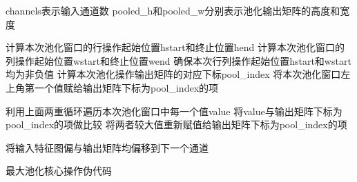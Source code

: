 \begin{algorithm}[htbp]
	\small
	\SetAlgoLined
    \begin{spacing}{0.8}
    channels表示输入通道数\;
    pooled\_h和pooled\_w分别表示池化输出矩阵的高度和宽度\;
     {
         {
             {
                计算本次池化窗口的行操作起始位置hstart和终止位置hend\;
                计算本次池化窗口的列操作起始位置wstart和终止位置wend\;
                确保本次行列操作起始位置hstart和wstart均为非负值\;
                计算本次池化操作输出矩阵的对应下标pool\_index\;
                将本次池化窗口左上角第一个值赋给输出矩阵下标为pool\_index的项\;

                 {
                     {
                    	利用上面两重循环遍历本次池化窗口中每一个值value\;
                        将value与输出矩阵下标为pool\_index的项做比较\;
                    	将两者较大值重新赋值给输出矩阵下标为pool\_index的项\;
                    }
                }
            }
        }
        将输入特征图偏与输出矩阵均偏移到下一个通道\;
    }
    \end{spacing}
	\caption{最大池化核心操作伪代码}
	\label{algo:algorithm5}
\end{algorithm}

